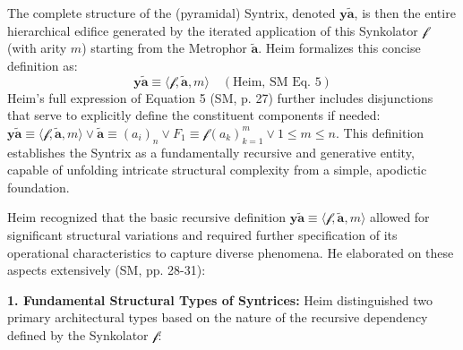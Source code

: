 \documentclass[
    12pt,              %
    a4paper,           %
    headings=normal,   %
    twoside=true,      %
    BCOR=8mm,          %
]{scrbook}
\newcommand{\syntrix}{\bm{y\widetilde{a}}}
\newcommand{\metrophor}{\bm{\widetilde{a}}}
\newcommand{\synkolator}{\mathcal{f}}
\newcommand{\synkolationsstufe}{m}
\newcommand{\syndrom}{F}
\begin{document}
The complete structure of the (pyramidal) Syntrix, denoted \(\syntrix\), is then the entire hierarchical edifice generated by the iterated application of this Synkolator \(\synkolator\) (with arity \(\synkolationsstufe\)) starting from the Metrophor \(\metrophor\). Heim formalizes this concise definition as:
\begin{equation} \label{eq:original_syntrix_definition_revised} %
\syntrix \equiv \langle \synkolator, \metrophor, \synkolationsstufe \rangle \quad (\text{Heim, SM Eq. 5})
\end{equation}
Heim’s full expression of Equation 5 (SM, p. 27) further includes disjunctions that serve to explicitly define the constituent components if needed: \(\syntrix \equiv \langle \synkolator, \metrophor, \synkolationsstufe \rangle \lor \metrophor \equiv (a_i)_n \lor \syndrom_1 \equiv \synkolator(a_k)^{\synkolationsstufe}_{k=1} \lor 1 \le \synkolationsstufe \le n\). This definition establishes the Syntrix as a fundamentally recursive and generative entity, capable of unfolding intricate structural complexity from a simple, apodictic foundation.

Heim recognized that the basic recursive definition \(\syntrix \equiv \langle \synkolator, \metrophor, \synkolationsstufe \rangle\) allowed for significant structural variations and required further specification of its operational characteristics to capture diverse phenomena. He elaborated on these aspects extensively (SM, pp. 28-31):

\textbf{1. Fundamental Structural Types of Syntrices:}
Heim distinguished two primary architectural types based on the nature of the recursive dependency defined by the Synkolator \(\synkolator\):
\end{document}
